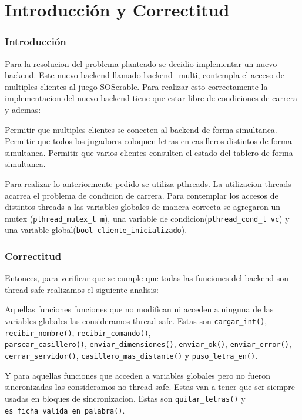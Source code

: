 \part{Introducci\'on y Correctitud}

\section{Introducci\'on}

Para la resolucion del problema planteado se decidio implementar un nuevo backend. Este nuevo backend llamado backend\_multi, contempla el acceso de multiples clientes al juego SOScrable. Para realizar esto correctamente la implementacion del nuevo backend tiene que estar libre de condiciones de carrera y ademas:

Permitir que multiples clientes se conecten al backend de forma simultanea.
Permitir que todos los jugadores coloquen letras en casilleros distintos de forma simultanea.
Permitir que varios clientes consulten el estado del tablero de forma simultanea.

Para realizar lo anteriormente pedido se utiliza pthreads. La utilizacion threads acarrea el problema de condicion de carrera. Para contemplar los accesos de distintos threads a las variables globales de manera correcta se agregaron un mutex (\verb|pthread_mutex_t m|), una variable de condicion(\verb|pthread_cond_t vc|) y una variable global(\verb|bool cliente_inicializado|).

\section{Correctitud}

Entonces, para verificar que se cumple que todas las funciones del backend son thread-safe realizamos el siguiente analisis:

Aquellas funciones funciones que no modifican ni acceden a ninguna de las variables globales las consideramos thread-safe. Estas son \verb|cargar_int()|, \verb|recibir_nombre()|, \verb|recibir_comando()|, \\
\verb|parsear_casillero()|, \verb|enviar_dimensiones()|, \verb|enviar_ok()|, \verb|enviar_error()|, \verb|cerrar_servidor()|, \verb|casillero_mas_distante()| y \verb|puso_letra_en()|.

Y para aquellas funciones que acceden a variables globales pero no fueron sincronizadas las consideramos no thread-safe. Estas van a tener que ser siempre usadas en bloques de sincronizacion. Estas son \verb|quitar_letras()| y \verb|es_ficha_valida_en_palabra()|.

